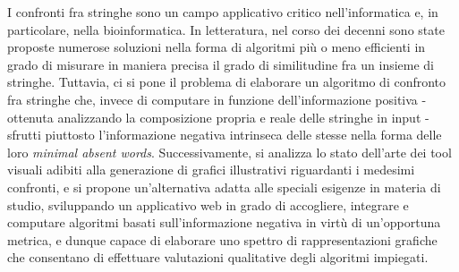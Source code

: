 I confronti fra stringhe sono un campo applicativo critico nell'informatica e, in particolare, nella bioinformatica. In letteratura, nel corso dei decenni sono state proposte numerose soluzioni nella forma di algoritmi più o meno efficienti in grado di misurare in maniera precisa il grado di similitudine fra un insieme di stringhe. Tuttavia, ci si pone il problema di elaborare un algoritmo di confronto fra stringhe che, invece di computare in funzione dell'informazione positiva - ottenuta analizzando la composizione propria e reale delle stringhe in input - sfrutti piuttosto l'informazione negativa intrinseca delle stesse nella forma delle loro \textit{minimal absent words}. Successivamente, si analizza lo stato dell'arte dei tool visuali adibiti alla generazione di grafici illustrativi riguardanti i medesimi confronti, e si propone un'alternativa adatta alle speciali esigenze in materia di studio, sviluppando un applicativo web in grado di accogliere, integrare e computare algoritmi basati sull'informazione negativa in virtù di un'opportuna metrica, e dunque capace di elaborare uno spettro di rappresentazioni grafiche che consentano di effettuare valutazioni qualitative degli algoritmi impiegati.